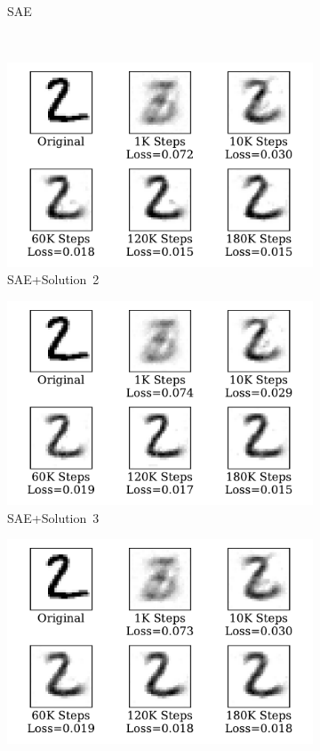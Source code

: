 \begin{figure}
\begin{subfigure}[t]{0.32\textwidth}
		\caption{SAE}
	\end{subfigure}\\
	\begin{subfigure}[t]{0.32\textwidth}
		\includegraphics[width=\textwidth]{pics_sdlm/42_MNIST_SAE_noise/recon_digit.pdf}
		\caption{SAE+Solution~2}
	\end{subfigure}
	\begin{subfigure}[t]{0.32\textwidth}
		\includegraphics[width=\textwidth]{pics_sdlm/41_MNIST_SAE_teach/recon_digit.pdf}
		\caption{SAE+Solution~3}
	\end{subfigure}
	\begin{subfigure}[t]{0.32\textwidth}
		\includegraphics[width=\textwidth]{pics_sdlm/43_MNIST_SAE_all/recon_digit.pdf}

\end{subfigure}
\end{figure}
